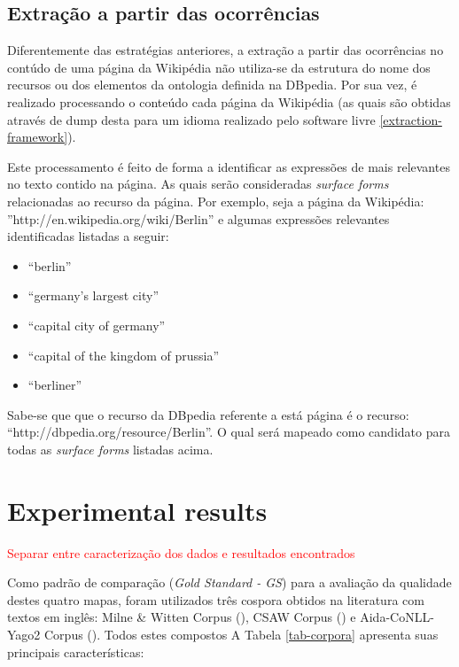 \documentclass[10pt,a4paper]{llncs}
\begin{document}
{\subsection{Extração a partir das ocorrências} \label{extracao-ocorrencias}
\indent\indent Diferentemente das estratégias anteriores, a extração a partir das ocorrências no contúdo de uma página da Wikipédia não utiliza-se da estrutura do nome dos recursos ou dos elementos da ontologia definida na DBpedia. Por sua vez, é realizado processando o conteúdo cada página da Wikipédia (as quais são obtidas através de dump desta para um idioma realizado pelo software livre \ref{extraction-framework}).

Este processamento é feito de forma a identificar as expressões de mais relevantes no texto contido na página. As quais serão consideradas \textit{surface forms} relacionadas ao recurso da página. Por exemplo, seja a página da Wikipédia: ''http://en.wikipedia.org/wiki/Berlin'' e algumas expressões relevantes identificadas listadas a seguir:
\begin{itemize}
 \item ``berlin''
 \item ``germany's largest city''
 \item ``capital city of germany''
 \item ``capital of the kingdom of prussia''
 \item ``berliner''
\end{itemize}

Sabe-se que que o recurso da DBpedia referente a está página é o recurso: ``http://dbpedia.org/resource/Berlin''. O qual será mapeado como candidato para todas as \textit{surface forms} listadas acima.


\section{Experimental results} \label{experimentos}

\textcolor{red}{Separar entre caracterização dos dados e resultados encontrados}

\indent\indent Como padrão de comparação (\textit{Gold Standard - GS}) para a avaliação da qualidade destes quatro mapas, foram utilizados três cospora obtidos na literatura com textos em inglês: Milne \& Witten Corpus (\cite{citep-MW-vide-apresentacao-spotters}), CSAW Corpus (\cite{citep-CSAW-vide-apresentacao-spotters}) e Aida-CoNLL-Yago2 Corpus (\cite{citep-MW-vide-apresentacao-spotters}). Todos estes compostos A Tabela \ref{tab-corpora} apresenta suas principais características:

}
\end{document}
